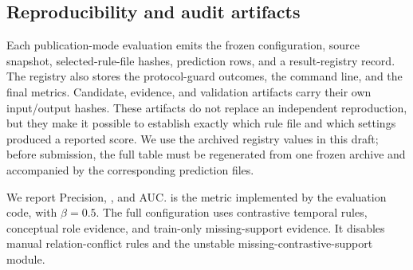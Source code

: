 \subsection{Reproducibility and audit artifacts}

Each publication-mode evaluation emits the frozen configuration, source snapshot, selected-rule-file hashes, prediction rows, and a result-registry record. The registry also stores the protocol-guard outcomes, the command line, and the final metrics. Candidate, evidence, and validation artifacts carry their own input/output hashes. These artifacts do not replace an independent reproduction, but they make it possible to establish exactly which rule file and which settings produced a reported score. We use the archived registry values in this draft; before submission, the full table must be regenerated from one frozen archive and accompanied by the corresponding prediction files.

We report Precision, \fbeta, and AUC. \fbeta is the metric implemented by the evaluation code, with $\beta=0.5$. The full \method configuration uses contrastive temporal rules, conceptual role evidence, and train-only missing-support evidence. It disables manual relation-conflict rules and the unstable missing-contrastive-support module.

